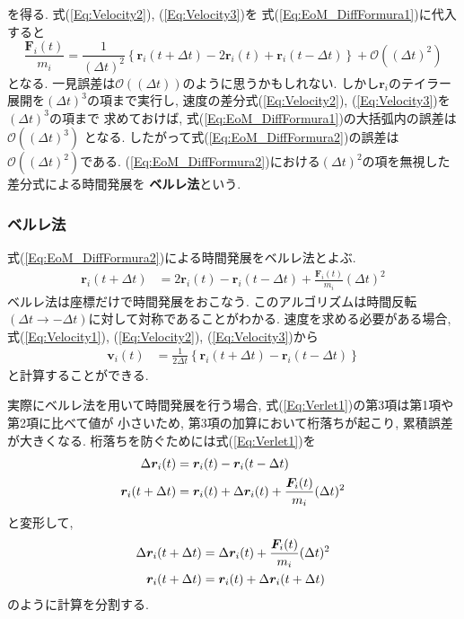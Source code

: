 を得る. 式(\ref{Eq:Velocity2}), (\ref{Eq:Velocity3})を
式(\ref{Eq:EoM_DiffFormura1})に代入すると
\begin{equation}
    \frac{\bm{F}_{i}(t)}{m_{i}}
 =
   \frac{1}{(\Delta t)^2}
   \left\{
            \bm{r}_{i} \left( t + \Delta t \right)
         - 2\bm{r}_{i} (t)
         +  \bm{r}_{i} \left( t - \Delta t \right)
   \right\}
   + \mathcal{O}((\Delta t)^2)
 \label{Eq:EoM_DiffFormura2}
\end{equation}
となる.
一見誤差は$\mathcal{O}((\Delta t))$のように思うかもしれない.
しかし$\bm{r}_{i}$のテイラー展開を$(\Delta t)^{3}$の項まで実行し, 
速度の差分式(\ref{Eq:Velocity2}), (\ref{Eq:Velocity3})を$(\Delta t)^{3}$の項まで
求めておけば, 式(\ref{Eq:EoM_DiffFormura1})の大括弧内の誤差は$\mathcal{O}((\Delta t)^{3})$
となる. 
したがって式(\ref{Eq:EoM_DiffFormura2})の誤差は$\mathcal{O}((\Delta t)^{2})$である.
(\ref{Eq:EoM_DiffFormura2})における$(\Delta t)^{2}$の項を無視した差分式による時間発展を
{\bf{ベルレ法}}という.

\subsubsection{ベルレ法}
式(\ref{Eq:EoM_DiffFormura2})による時間発展をベルレ法とよぶ.
\begin{align}
  \bm{r}_{i}(t + \Delta t) 
&=
  2\bm{r}_{i}(t) - \bm{r}_{i}(t - \Delta t) + \frac{\bm{F}_{i}(t)}{m_{i}} (\Delta t)^{2}
  \label{Eq:Verlet1}
\end{align}
ベルレ法は座標だけで時間発展をおこなう.
このアルゴリズムは時間反転$(\Delta t \to -\Delta t)$に対して対称であることがわかる.
速度を求める必要がある場合, 式(\ref{Eq:Velocity1}), (\ref{Eq:Velocity2}), (\ref{Eq:Velocity3})から
\begin{align}
  \bm{v}_{i}(t)
&=
  \frac{1}{2 \Delta t}
  \left\{
          \bm{r}_{i} (t + \Delta t) - \bm{r}_{i} (t - \Delta t)
  \right\}
  \label{Eq:Verlet2}
\end{align}
と計算することができる.


実際にベルレ法を用いて時間発展を行う場合, 式(\ref{Eq:Verlet1})の第3項は第1項や第2項に比べて値が
小さいため, 第3項の加算において桁落ちが起こり, 累積誤差が大きくなる. 
桁落ちを防ぐためには式(\ref{Eq:Verlet1})を
\begin{align}
 \Delta \bm{r}_{i}(t) &= \bm{r}_{i}(t) - \bm{r}_{i}(t - \Delta t)
 \notag
 \\
 \bm{r}_{i}(t + \Delta t) 
&= \bm{r}_{i}(t) + \Delta \bm{r}_{i}(t)
 + \frac{\bm{F}_{i}(t)}{m_{i}} (\Delta t)^{2} 
\end{align}
と変形して,
\begin{align}
   \Delta \bm{r}_{i} (t + \Delta t) 
&= \Delta \bm{r}_{i} (t) + \frac{\bm{F}_{i}(t)}{m_{i}} (\Delta t)^{2}
 \notag
 \\
   \bm{r}_{i} (t + \Delta t) 
&= \bm{r}_{i}(t) + \Delta \bm{r}_{i} (t + \Delta t)
\end{align}
のように計算を分割する. 

